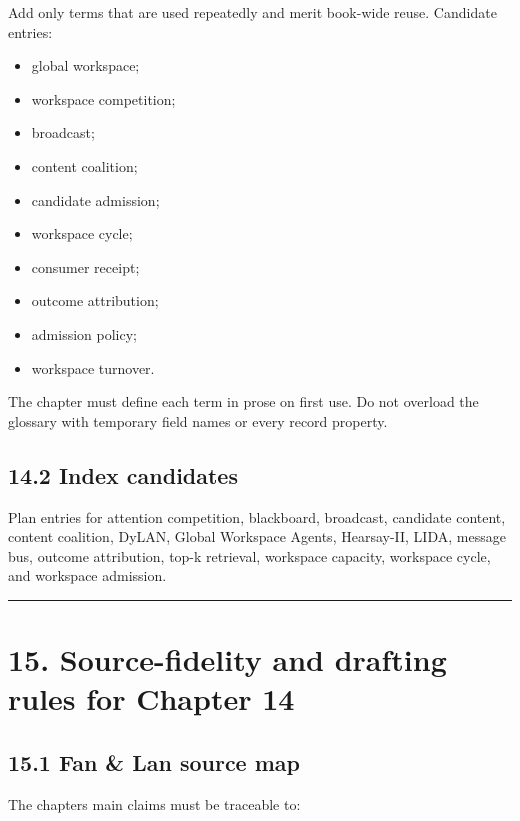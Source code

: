 Add only terms that are used repeatedly and merit book-wide reuse. Candidate entries:

\begin{itemize}
\tightlist
\item
  global workspace;
\item
  workspace competition;
\item
  broadcast;
\item
  content coalition;
\item
  candidate admission;
\item
  workspace cycle;
\item
  consumer receipt;
\item
  outcome attribution;
\item
  admission policy;
\item
  workspace turnover.
\end{itemize}

The chapter must define each term in prose on first use. Do not overload the glossary with temporary field names or every record property.

\subsection{14.2 Index candidates}\label{142-index-candidates}

Plan entries for attention competition, blackboard, broadcast, candidate content, content coalition, DyLAN, Global Workspace Agents, Hearsay-II, LIDA, message bus, outcome attribution, top-k retrieval, workspace capacity, workspace cycle, and workspace admission.

\begin{center}\rule{0.5\linewidth}{0.5pt}\end{center}

\section{15. Source-fidelity and drafting rules for Chapter 14}\label{15-source-fidelity-and-drafting-rules-for-chapter-14}

\subsection{15.1 Fan \& Lan source map}\label{151-fan--lan-source-map}

The chapter\textquotesingle s main claims must be traceable to:

